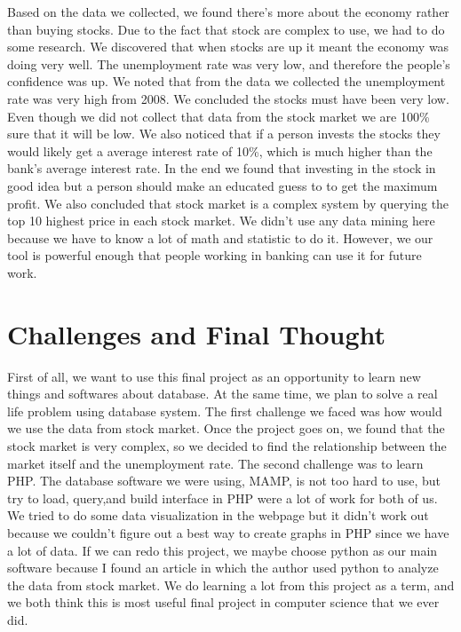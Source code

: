 \documentclass[12pt]{report}
\begin{document}
Based on the data we collected, we found there's more about the economy rather than buying stocks. Due to the fact that stock are complex to use, we had to do some research. We discovered that when stocks are up it meant the economy was doing very well. The unemployment rate was very low, and therefore the people's confidence was up. We noted that from the data we collected the unemployment rate was very high from 2008. We concluded the stocks must have been very low. Even though we did not collect that data from the stock market we are 100\% sure that it will be low. We also noticed that if a person invests the stocks they would likely get a average interest rate of 10\%, which is much higher than the bank's average interest rate. In the end we found that investing in the stock in good idea but a person should make an educated guess to to get the maximum profit. We also concluded that stock market is a complex system by querying the top 10 highest price in each stock market. We didn't use any data mining here because we have to know a lot of math and statistic to do it. However, we our tool is powerful enough that people working in banking can use it for future work.       

\section{Challenges and Final Thought}

First of all, we want to use this final project as an opportunity to learn new things and softwares about database. At the same time, we plan to solve a real life problem using database system. The first challenge we faced was how would we use the data from stock market. Once the project goes on, we found that the stock market is very complex, so we decided to find the relationship between the market itself and the unemployment rate. The second challenge was to learn PHP. The database software we were using, MAMP, is not too hard to use, but try to load, query,and build interface in PHP were a lot of work for both of us. We tried to do some data visualization in the webpage but it didn't work out because we couldn't figure out a best way to create graphs in PHP since we have a lot of data. If we can redo this project, we maybe choose python as our main software because I found an article in which the author used python to analyze the data from stock market. We do learning a lot from this project as a term, and we both think this is most useful final project in computer science that we ever did.
\newpage
\end{document}

